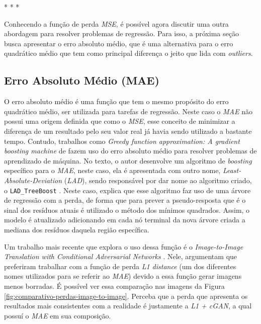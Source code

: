 \medskip
\begin{center}
 * * *
\end{center}
\medskip

Conhecendo a função de perda \textit{MSE}, é possível agora discutir uma outra abordagem para resolver problemas de regressão. Para isso, a próxima seção busca apresentar o erro absoluto médio, que é uma alternativa para o erro quadrático médio que tem como principal diferença o jeito que lida com \textit{outliers}.

\subsection{Erro Absoluto Médio (MAE)}

O erro absoluto médio é uma função que tem o mesmo propósito do erro quadrático médio, ser utilizada para tarefas de regressão. Neste caso o \textit{MAE} não possui uma origem definida que como o \textit{MSE}, esse conceito de minimizar a diferença de um resultado pelo seu valor real já havia sendo utilizado a bastante tempo. Contudo, trabalhos como \textit{Greedy function approximation: A gradient boosting machine} de \textcite{GreedyFunctionApproximation} fazem uso do erro absoluto médio para resolver problemas de aprendizado de máquina. No texto, o autor desenvolve um algoritmo de \textit{boosting} específico para o \textit{MAE}, neste caso, ela é apresentada com outro nome, \textit{Least-Absolute-Deviation} (\textit{LAD}), sendo responsável por dar nome ao algoritmo criado, o \texttt{LAD\_TreeBoost} \parencite{GreedyFunctionApproximation}. Neste caso, \textcite{GreedyFunctionApproximation} explica que esse algoritmo faz uso de uma árvore de regressão com a perda, de forma que para prever a pseudo-resposta que é o sinal dos resíduos atuais é utilizado o método dos mínimos quadrados. Assim, o modelo é atualizado adicionando em cada nó terminal da nova árvore criada a mediana dos resíduos daquela região específica.

Um trabalho mais recente que explora o uso dessa função é o \textit{Image-to-Image Translation with Conditional Adversarial Networks} \parencite{ImageToImage}. Nele, \textcite{ImageToImage} argumentam que preferiram trabalhar com a função de perda \textit{L1 distance} (um dos diferentes nomes utilizados para se referir ao \textit{MAE}) devido a essa função gerar imagens menos borradas. É possível ver essa comparação nas imagens da Figura \ref{fig:comparativo-perdas-image-to-image}. Perceba que a perda que apresenta os resultados mais consistentes com a realidade é justamente a \textit{L1 + cGAN}, a qual possuí o \textit{MAE} em sua composição.

